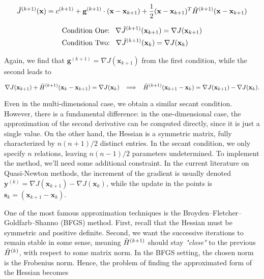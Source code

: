 \documentclass{article}
\numberwithin{equation}{subsection}
\begin{document}
\begin{gather*}
    \Tilde{J}^{(k+1)}(\textbf{x}) = c^{(k+1)} + \textbf{g}^{(k+1)}\cdot (\textbf{x} - \textbf{x}_{k+1}) + \frac{1}{2} (\textbf{x} - \textbf{x}_{k+1})^T \Tilde{H}^{(k+1)} (\textbf{x} - \textbf{x}_{k+1})
\end{gather*}

\begin{equation*}
\begin{split}
    &\text{Condition One:} \;\;\; \nabla \Tilde{J}^{(k+1)}(\textbf{x}_{k+1}) = \nabla J(\textbf{x}_{k+1}) \\
    &\text{Condition Two:} \;\;\; \nabla \Tilde{J}^{(k+1)}(\textbf{x}_{k}) = \nabla J(\textbf{x}_{k})
\end{split}
\end{equation*}

Again, we find that $\textbf{g}^{(k+1)} = \nabla J(\textbf{x}_{k+1})$ from the first condition, while the second leads to

\begin{equation*}
    \nabla J(\textbf{x}_{k+1}) + \Tilde{H}^{(k+1)} (\textbf{x}_{k} - \textbf{x}_{k+1}) = \nabla J(\textbf{x}_k) 
    \;\; \implies \;\; 
    \Tilde{H}^{(k+1)}(\textbf{x}_{k+1} - \textbf{x}_k) = \nabla J(\textbf{x}_{k+1}) - \nabla J(\textbf{x}_k).
\end{equation*}

Even in the multi-dimensional case, we obtain a similar secant condition. However, there is a fundamental difference: in the one-dimensional case, the approximation of the second derivative can be computed directly, since it is just a single value. On the other hand, the Hessian is a symmetric matrix, fully characterized by $n(n+1)/2$ distinct entries. In the secant condition, we only specify $n$ relations, leaving $n(n-1)/2$ parameters undetermined. To implement the method, we'll need some additional constraint. In the current literature on Quasi-Newton methods, the increment of the gradient is usually denoted $\textbf{y}^{(k)} = \nabla J(\textbf{x}_{k+1}) - \nabla J(\textbf{x}_k)$, while the update in the points is $\textbf{s}_k = (\textbf{x}_{k+1} - \textbf{x}_k)$. 

One of the most famous approximation techniques is the Broyden–Fletcher–Goldfarb–Shanno (BFGS) method. First, recall that the Hessian must be symmetric and positive definite. Second, we want the successive iterations to remain stable in some sense, meaning $\Tilde{H}^{(k+1)}$ should stay \textit{"close"} to the previous $\Tilde{H}^{(k)}$, with respect to some matrix norm. In the BFGS setting, the chosen norm is the Frobenius norm. Hence, the problem of finding the approximated form of the Hessian becomes
\end{document}
